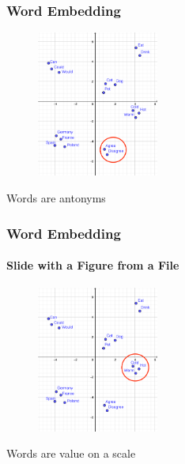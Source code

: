 

\begin{frame}
	\frametitle{Word Embedding}

	\begin{figure}
		\includegraphics[width=4cm]{./figures/Group_antonyms}

	\end{figure}
		\begin{center}
		{Words are antonyms}
		\end{center}
	\vspace{-0.5cm}

\end{frame}



\begin{frame}
	\frametitle{Word Embedding}
		\framesubtitle{Slide with a Figure from a File}

	\begin{figure}
		\includegraphics[width=4cm]{./figures/Group_scale}

	\end{figure}
		\begin{center}
		{Words are value on a scale}
		\end{center}
	\vspace{-0.5cm}

\end{frame}

